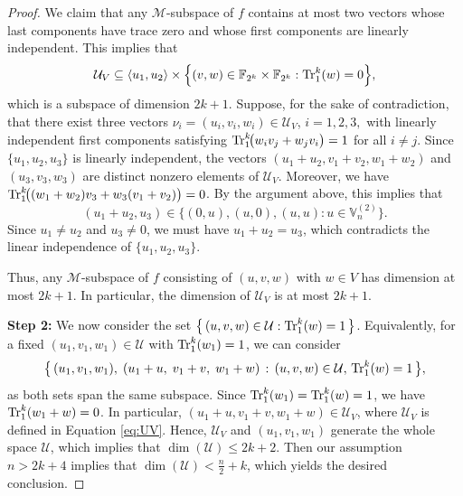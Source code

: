 \documentclass[12pt]{article}
\theoremstyle{plain}
\theoremstyle{definition}
\newcommand{\V}{\mathbb{V}}
\newcommand{\Tr}{{\rm Tr}}
\begin{document}
\begin{proof}
		We claim that any $\mathcal{M}$-subspace of $f$ contains at most two vectors whose last components have trace zero and whose first components are linearly independent.
		This implies that
		\begin{align*}
			\mathcal{U}_V
			\subseteq
			\langle u_1,u_2\rangle
			\times
			\Bigl\{(v,w)\in \mathbb{F}_{2^k}\times \mathbb{F}_{2^k} :
			\Tr_1^k(w)=0
			\Bigr\},
		\end{align*}
		which is a subspace of dimension \(2k+1\).
		Suppose, for the sake of contradiction, that there exist three vectors \(\nu_i=(u_i,v_i,w_i) \in \mathcal{U}_V\), \(i=1,2,3,\) with linearly independent first components satisfying $\Tr_1^k\!\bigl(w_i v_j+w_j v_i\bigr)=1$ for all $i\neq j$.
		Since \(\{u_1,u_2,u_3\}\) is linearly independent, the vectors
		\((u_1+u_2,v_1+v_2,w_1+w_2)\) and
		\((u_3,v_3,w_3)\)
		are distinct nonzero elements of $\mathcal{U}_V$. 
		Moreover, we have $\Tr_1^k\!\bigl((w_1+w_2)v_3+w_3(v_1+v_2)\bigr)=0$.
		By the argument above, this implies that
		\[
		(u_1+u_2,u_3)\in \{(0,u),(u,0),(u,u):u\in \V_n^{(2)}\}.
		\]
		Since \(u_1\neq u_2\) and \(u_3\neq 0\), we must have \(u_1+u_2=u_3\),
		which contradicts the linear independence of \(\{u_1,u_2,u_3\}\).
		
		Thus, any \(\mathcal{M}\)-subspace of \(f\) consisting of 
		\((u,v,w)\) with \(w\in V\) has dimension at most \(2k+1\). In particular, the dimension of $\mathcal{U}_V$ is at most \(2k+1\).
		
		\medskip
		\noindent\textbf{Step 2:}  
		We now consider the set $\bigl\{\, (u,v,w) \in \mathcal{U} : \Tr_1^k(w)=1 \,\bigr\}$. 
		Equivalently, for a fixed $(u_1,v_1,w_1)\in\mathcal{U} $ with $\Tr_1^k(w_1)=1$, we can consider  
		\[
		\bigl\{\, (u_1,v_1,w_1),\; (u_1+u,\;v_1+v,\;w_1+w) \, : \, (u,v,w)\in \mathcal{U}, \, \Tr_1^k(w)=1 \,\bigr\},
		\]
		as both sets span the same subspace.
		Since \(\Tr_1^k(w_1)=\Tr_1^k(w)=1\), we have \(\Tr_1^k(w_1+w)=0\).  
		In particular,  
		\((u_1+u,v_1+v,w_1+w)\in \mathcal{U}_V\), 
		where \(\mathcal{U}_V\) is defined in Equation \eqref{eq:UV}.  
		Hence, \(\mathcal{U}_V\) and \((u_1,v_1,w_1)\) generate the whole space \(\mathcal{U}\), which implies that 
		\(\dim (\mathcal{U})\leq 2k+2\). Then our assumption $n > 2k + 4$ implies that $\dim(\mathcal U) < \tfrac{n}{2} + k$,
		which yields the desired conclusion.
	\end{proof}
	
\end{document}
